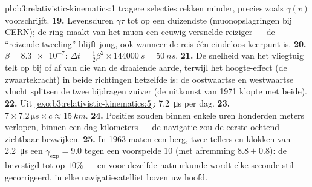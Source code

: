\begin{solution}{pb:b3:relativistic-kinematics:1}
tragere selecties rekken minder, precies zoals $\gamma(v)$ voorschrijft.
\textbf{19.} Levensduren $\gamma\tau$ tot op een duizendste
(muonopslagringen bij CERN); de ring maakt van het muon een eeuwig
versnelde reiziger --- de ``reizende tweeling'' blijft jong, ook wanneer
de reis één eindeloos keerpunt is.
\textbf{20.} $\beta = \num{8.3e-7}$: $\Delta t = \tfrac12\beta^2
\times \qty{144000}{s} = \qty{50}{ns}$.
\textbf{21.} De snelheid van het vliegtuig telt op bij of af van die van
de draaiende aarde, terwijl het hoogte-effect (de zwaartekracht) in beide
richtingen hetzelfde is: de oostwaartse en westwaartse vlucht splitsen de
twee bijdragen zuiver (de uitkomst van 1971 klopte met beide).
\textbf{22.} Uit \cref{exo:b3:relativistic-kinematics:5}:
\qty{7.2}{\micro s} per dag.
\textbf{23.} $7 \times 7.2\,\unit{\micro s} \times c \approx
\qty{15}{km}.$
\textbf{24.} Posities zouden binnen enkele uren honderden meters
verlopen, binnen een dag kilometers --- de navigatie zou de eerste
ochtend zichtbaar bezwijken.
\textbf{25.} In 1963 maten een berg, twee tellers en klokken van
\qty{2.2}{\micro s} een $\gamma_{\exp} = 9.0$ tegen een voorspelde $10$
(met afremming $8.8 \pm 0.8$): de  bevestigd tot op $10\%$ --- en
voor dezelfde natuurkunde wordt elke seconde stil gecorrigeerd, in elke
navigatiesatelliet boven uw hoofd.
\end{solution}
